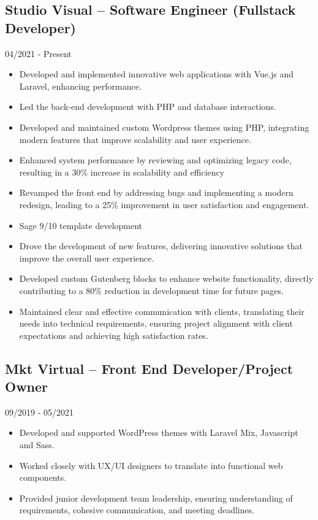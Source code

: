 \documentclass[11pt, a4paper]{article}
\begin{document}
\subsection*{Studio Visual -- Software Engineer (Fullstack Developer)}\hfill 04/2021 - Present
\begin{itemize}
    \item Developed and implemented innovative web applications with Vue.js and Laravel, enhancing performance.
    \item Led the back-end development with PHP and database interactions.
    \item Developed and maintained custom Wordpress themes using PHP, integrating modern features that improve scalability and user experience.
    \item Enhanced system performance by reviewing and optimizing legacy code, resulting in a 30\% increase in scalability and efficiency
    \item Revamped the front end by addressing bugs and implementing a modern redesign, leading to a 25\% improvement in user satisfaction and engagement.
    \item Sage 9/10 template development
    \item Drove the development of new features, delivering innovative solutions that improve the overall user experience.
    \item Developed custom Gutenberg blocks to enhance website functionality, directly contributing to a 80\% reduction in development time for future pages.
    \item Maintained clear and effective communication with clients, translating their needs into technical requirements, ensuring project alignment with client expectations and achieving high satisfaction rates.
\end{itemize}

\subsection*{Mkt Virtual -- Front End Developer/Project Owner}
\hfill 09/2019 - 05/2021
\begin{itemize}
    \item Developed and supported WordPress themes with Laravel Mix, Javascript and Sass.
    \item Worked closely with UX/UI designers to translate into functional web components.
    \item Provided junior development team leadership, ensuring understanding of requirements, cohesive communication, and meeting deadlines.
\end{itemize}
\end{document}
